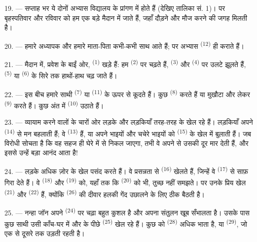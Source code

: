 19. --- सप्ताह भर ये दोनों अभ्यास विद्यालय के प्रांगण में होते हैं (देखिए
तालिका सं. 1)। पर बृहस्पतिवार और रविवार को हम एक बड़े मैदान में जाते हैं, जहाँ
दौड़ने और मौज करने की जगह मिलती है।

20. --- हमारे अध्यापक और हमारे माता-पिता कभी-कभी साथ आते हैं; पर अभ्यास
 \textsuperscript{(12)} ही कराते हैं।

21. --- मैदान में, प्रवेश के बाईं ओर, 
\textsuperscript{(1)} खड़े हैं: हम  \textsuperscript{(2)} पर चढ़ते हैं,
 \textsuperscript{(3)} और  \textsuperscript{(4)} पर
उलटे झूलते हैं,  \textsuperscript{(5)} या
 \textsuperscript{(6)} के सिरे तक हाथों-हाथ चढ़ जाते हैं।

22. --- इस बीच हमारे साथी  \textsuperscript{(7)} या
 \textsuperscript{(11)} के ऊपर से कूदते हैं। कुछ
 \textsuperscript{(8)} करते हैं या मुखौटा और 
लेकर  \textsuperscript{(9)} करते हैं। कुछ अंत में
 \textsuperscript{(10)} उठाते हैं।

\VUsaut{4.6mm}
\VUsaut{3.0mm}

23. --- व्यायाम करने वालों के चारों ओर लड़के और लड़कियाँ तरह-तरह के
 खेल रहे हैं। लड़कियाँ अपने  \textsuperscript{(14)} से मन
बहलाती हैं; वे  \textsuperscript{(13)} हैं, या अपने भाइयों और
चचेरे भाइयों को  \textsuperscript{(15)} के खेल में बुलाती हैं। जब
विरोधी सोचता है कि वह सहज ही घेरे में से निकल जाएगा, तभी वे अपने
 से उसकी  दूर मार देती हैं, और इससे उन्हें
बड़ा आनंद आता है!

24. --- लड़के अधिक ज़ोर के खेल पसंद करते हैं। वे प्रसन्नता से
 \textsuperscript{(16)} खेलते हैं, जिन्हें वे 
\textsuperscript{(17)} से साफ़ गिरा देते हैं। वे  \textsuperscript{(18)}
और  \textsuperscript{(19)} को, यहाँ तक कि
 \textsuperscript{(20)} को भी, तुच्छ नहीं समझते। पर उनके
प्रिय खेल  \textsuperscript{(21)} और 
\textsuperscript{(22)} हैं, क्योंकि  \textsuperscript{(26)} की दीवार
हलकी गेंद उछालने के लिए ठीक बैठती है।

25. --- नन्हा जॉन अपने  \textsuperscript{(24)} पर चढ़ा बहुत कुशल है
और अपना संतुलन खूब सँभालता है। उसके पास कुछ साथी उसी काँच-घर में और
 के पीछे  \textsuperscript{(25)} खेल रहे हैं। कुछ
को  \textsuperscript{(28)} अधिक भाता है, या
 \textsuperscript{(29)}, जो एक  से दूसरे तक उड़ती
रहती है।

